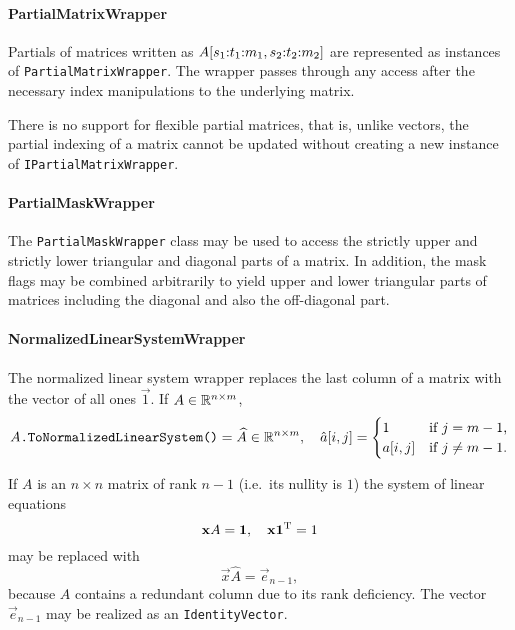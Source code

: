 \paragraph{PartialMatrixWrapper}

Partials of matrices written as
$A[s_1{:}t_1{:}m_1, s_2{:}t_2{:}m_2]$ are represented as
instances of \texttt{PartialMatrixWrapper}. The wrapper passes through
any access after the necessary index manipulations to the underlying
matrix.

There is no support for flexible partial matrices, that is, unlike
vectors, the partial indexing of a matrix cannot be updated without
creating a new instance of \texttt{IPartialMatrixWrapper}.

\paragraph{PartialMaskWrapper}

The \texttt{PartialMaskWrapper} class may be used to access the
strictly upper and strictly lower triangular and diagonal parts of a
matrix. In addition, the mask flags may be combined arbitrarily to
yield upper and lower triangular parts of matrices including the
diagonal and also the off-diagonal part.

\paragraph{NormalizedLinearSystemWrapper}

The normalized linear system wrapper replaces the last column of a
matrix with the vector of all ones $\vec{1}$. If $A \in \mathbb{R}^{n \times
  m}$,
\begin{equation}
  \texttt{$A$.ToNormalizedLinearSystem()} = \widehat{A} \in \mathbb{R}^{n \times
    m}, \quad \hat{a}[i, j] =
  \begin{cases}
    1 & \text{if $j = m - 1$,} \\
    a[i, j] & \text{if $j \ne m - 1$.}
  \end{cases}
\end{equation}

If $A$ is an $n \times n$ matrix of rank $n  - 1$ (i.e.~its nullity is
$1$) the system of linear equations
\begin{equation}
  \bm{\mathrm{x}} A = \bm{\mathrm{1}}, \quad \bm{\mathrm{x}} \bm{\mathrm{1}}^{\mathrm{T}} = 1
\end{equation}
may be replaced with
\begin{equation}
  \vec{x} \widehat{A} = \vec{e}_{n - 1},
\end{equation}
because $A$ contains a redundant column due to its rank
deficiency. The vector $\vec{e}_{n - 1}$ may be realized as an
\texttt{IdentityVector}.

